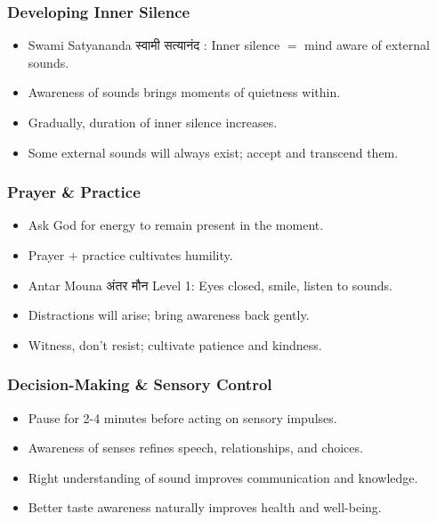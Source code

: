 \begin{frame}[fragile]\frametitle{Developing Inner Silence}
    \begin{itemize}
        \item Swami Satyananda स्वामी सत्यानंद : Inner silence $=$ mind aware of external sounds.
        \item Awareness of sounds brings moments of quietness within.
        \item Gradually, duration of inner silence increases.
        \item Some external sounds will always exist; accept and transcend them.
    \end{itemize}
\end{frame}

\begin{frame}[fragile]\frametitle{Prayer \& Practice}
    \begin{itemize}
        \item Ask God for energy to remain present in the moment.
        \item Prayer $+$ practice cultivates humility.
        \item Antar Mouna अंतर मौन Level 1: Eyes closed, smile, listen to sounds.
        \item Distractions will arise; bring awareness back gently.
        \item Witness, don’t resist; cultivate patience and kindness.
    \end{itemize}
\end{frame}

\begin{frame}[fragile]\frametitle{Decision-Making \& Sensory Control}
    \begin{itemize}
        \item Pause for 2-4 minutes before acting on sensory impulses.
        \item Awareness of senses refines speech, relationships, and choices.
        \item Right understanding of sound improves communication and knowledge.
        \item Better taste awareness naturally improves health and well-being.
    \end{itemize}
\end{frame}

